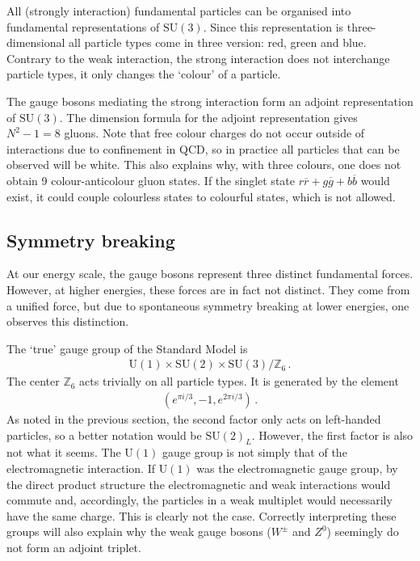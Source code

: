     \begin{property}
        All (strongly interaction) fundamental particles can be organised into fundamental representations of $\mathrm{SU}(3)$. Since this representation is three-dimensional all particle types come in three version: red, green and blue. Contrary to the weak interaction, the strong interaction does not interchange particle types, it only changes the `colour' of a particle.

        The gauge bosons mediating the strong interaction form an adjoint representation of $\mathrm{SU}(3)$. The dimension formula for the adjoint representation gives $N^2-1=8$ gluons. Note that free colour charges do not occur outside of interactions due to confinement in QCD, so in practice all particles that can be observed will be white. This also explains why, with three colours, one does not obtain 9 colour-anticolour gluon states. If the singlet state $r\overline{r}+g\overline{g}+b\overline{b}$ would exist, it could couple colourless states to colourful states, which is not allowed.
    \end{property}

\subsection{Symmetry breaking}

    At our energy scale, the gauge bosons represent three distinct fundamental forces. However, at higher energies, these forces are in fact not distinct. They come from a unified force, but due to spontaneous symmetry breaking at lower energies, one observes this distinction.

    The `true' gauge group of the Standard Model is
    \begin{gather}
        \mathrm{U}(1)\times\mathrm{SU}(2)\times\mathrm{SU}(3)/\mathbb{Z}_6\,.
    \end{gather}
    The center $\mathbb{Z}_6$ acts trivially on all particle types. It is generated by the element
    \begin{gather}
        (e^{\pi i/3},-1,e^{2\pi i/3})\,.
    \end{gather}
    As noted in the previous section, the second factor only acts on left-handed particles, so a better notation would be $\mathrm{SU}(2)_L$. However, the first factor is also not what it seems. The $\mathrm{U}(1)$ gauge group is not simply that of the electromagnetic interaction. If $\mathrm{U}(1)$ was the electromagnetic gauge group, by the direct product structure the electromagnetic and weak interactions would commute and, accordingly, the particles in a weak multiplet would necessarily have the same charge. This is clearly not the case. Correctly interpreting these groups will also explain why the weak gauge bosons ($W^\pm$ and $Z^0$) seemingly do not form an adjoint triplet.

